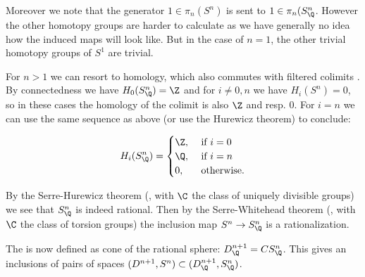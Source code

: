 Moreover we note that the generator $1 \in \pi_n(S^n)$ is sent to $1 \in \pi_n(S^n_\Q$. However the other homotopy groups are harder to calculate as we have generally no idea how the induced maps will look like. But in the case of $n=1$, the other trivial homotopy groups of $S^1$ are trivial.


For $n>1$ we can resort to homology, which also commutes with filtered colimits \cite[14.6]{may}. By connectedness we have $H_0(S^n_\Q) = \Z$ and for $i \neq 0, n$ we have $H_i(S^n) = 0$, so in these cases the homology of the colimit is also $\Z$ and resp. $0$. For $i = n$ we can use the same sequence as above (or use the Hurewicz theorem) to conclude:

$$ H_i(S^n_\Q) = \begin{cases}
	\Z, &\text{ if } i = 0 \\
	\Q, &\text{ if } i = n \\
	0,  &\text{ otherwise.}
\end{cases} $$

By the Serre-Hurewicz theorem (, with $\C$ the class of uniquely divisible groups) we see that $S^n_\Q$ is indeed rational. Then by the Serre-Whitehead theorem (, with $\C$ the class of torsion groups) the inclusion map $S^n \to S^n_\Q$ is a rationalization.


The  is now defined as cone of the rational sphere: $D^{n+1}_\Q = CS^n_\Q$. This gives an inclusions of pairs of spaces $(D^{n+1}, S^n) \subset (D^{n+1}_\Q, S^n_\Q)$.


